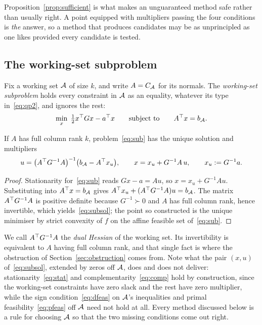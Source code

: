 Proposition~\ref{prop:sufficient} is what makes an unguaranteed method safe rather
than usually right. A point equipped with multipliers passing the four conditions
is \emph{the} answer, so a method that produces candidates may be as unprincipled
as one likes provided every candidate is tested.

\subsection{The working-set subproblem}

Fix a working set $\mathcal{A}$ of size $k$, and write $A = C_{\mathcal{A}}$ for its
normals. The \emph{working-set subproblem} holds every constraint in $\mathcal{A}$ as
an equality, whatever its type in~\eqref{eq:qp2}, and ignores the rest:
\begin{equation}
  \min_{x} \; \tfrac12 x^{\top} G x - a^{\top} x
  \qquad \text{subject to} \qquad A^{\top} x = b_{\mathcal{A}} .
  \label{eq:sub}
\end{equation}

\begin{proposition}\label{prop:sub}
If $A$ has full column rank $k$, problem~\eqref{eq:sub} has the unique solution
and multipliers
\begin{equation}
  u = \bigl(A^{\top} G^{-1} A\bigr)^{-1}\bigl(b_{\mathcal{A}} - A^{\top} x_u\bigr),
  \qquad
  x = x_u + G^{-1} A\, u,
  \qquad x_u := G^{-1} a .
  \label{eq:subsol}
\end{equation}
\end{proposition}

\begin{proof}
Stationarity for~\eqref{eq:sub} reads $Gx - a = Au$, so
$x = x_u + G^{-1}Au$. Substituting into $A^{\top} x = b_{\mathcal{A}}$ gives
$A^{\top} x_u + (A^{\top} G^{-1}A)u = b_{\mathcal{A}}$. The matrix $A^{\top} G^{-1} A$ is positive
definite because $G^{-1} \succ 0$ and $A$ has full column rank, hence invertible,
which yields~\eqref{eq:subsol}; the point so constructed is the unique minimiser
by strict convexity of $f$ on the affine feasible set of~\eqref{eq:sub}.
\end{proof}

We call $A^{\top} G^{-1} A$ the \emph{dual Hessian} of the working set. Its
invertibility is equivalent to $A$ having full column rank, and that single fact
is where the obstruction of Section~\ref{sec:obstruction} comes from. Note what
the pair $(x,u)$ of~\eqref{eq:subsol}, extended by zeros off $\mathcal{A}$, does and
does not deliver: stationarity~\eqref{eq:stat} and complementarity~\eqref{eq:comp}
hold by construction, since the working-set constraints have zero slack and the
rest have zero multiplier, while the sign condition~\eqref{eq:dfeas} on
$\mathcal{A}$'s inequalities and primal feasibility~\eqref{eq:pfeas} off $\mathcal{A}$
need not hold at all. Every method discussed below is a rule for choosing
$\mathcal{A}$ so that the two missing conditions come out right.
